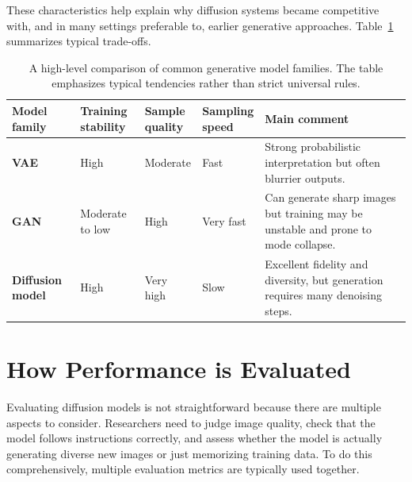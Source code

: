\documentclass[a4paper,12pt]{article}
\begin{document}
These characteristics help explain why diffusion systems became competitive with, and in many settings preferable to, earlier generative approaches. Table~\ref{tab:model-comparison} summarizes typical trade-offs.

\begin{table}[H]
    \centering
    {\small
    \begin{tabularx}{\linewidth}{>{\raggedright\arraybackslash\bfseries}p{1.95cm}>{\raggedright\arraybackslash}p{2.15cm}>{\raggedright\arraybackslash}p{1.85cm}>{\raggedright\arraybackslash}p{1.8cm}>{\raggedright\arraybackslash}X}
        \toprule
        \shortstack[l]{Model\\family} &
        \shortstack[l]{Training\\stability} &
        \shortstack[l]{Sample\\quality} &
        \shortstack[l]{Sampling\\speed} &
        Main comment \\
        \midrule
        VAE & High & Moderate & Fast & Strong probabilistic interpretation but often blurrier outputs. \\
        GAN & Moderate to low & High & Very fast & Can generate sharp images but training may be unstable and prone to mode collapse. \\
        Diffusion model & High & Very high & Slow & Excellent fidelity and diversity, but generation requires many denoising steps. \\
        \bottomrule
    \end{tabularx}
    }
    \caption[Comparison of common generative model families]{A high-level comparison of common generative model families. The table emphasizes typical tendencies rather than strict universal rules.}
    \label{tab:model-comparison}
\end{table}

\section{How Performance is Evaluated}
Evaluating diffusion models is not straightforward because there are multiple aspects to consider. Researchers need to judge image quality, check that the model follows instructions correctly, and assess whether the model is actually generating diverse new images or just memorizing training data. To do this comprehensively, multiple evaluation metrics are typically used together.
\end{document}
